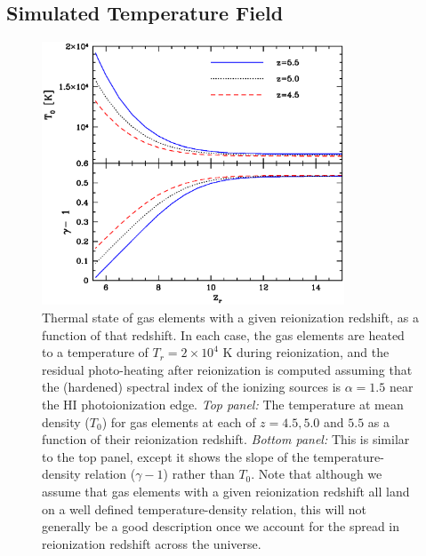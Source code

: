 \subsection{Simulated Temperature Field}
\label{sec:IGMTemptemp_sim}

\begin{figure}
\bc
\includegraphics[width=9cm]{f2.eps}
\caption{Thermal state of gas elements with a given reionization redshift, as a function of that redshift. In each case, the gas elements are heated to
a temperature of $T_r=2 \times 10^4$ K during reionization, and the residual photo-heating after reionization is computed assuming that the
(hardened) spectral index of the ionizing sources is $\alpha=1.5$ near the HI photoionization edge. {\em Top panel:} The temperature
at mean density ($T_0$) for gas elements at each of $z=4.5,5.0$ and $5.5$ as a function of their reionization redshift. {\em Bottom panel:} This is similar to the top panel, except it shows the slope of the temperature-density relation ($\gamma-1$) rather than $T_0$. Note that although we assume that gas
elements with a given reionization redshift all land on a well defined temperature-density relation, this will not generally be
a good description once we account for the spread in reionization redshift across the universe. }
\label{fig:tden_v_zr}
\ec
\end{figure}

